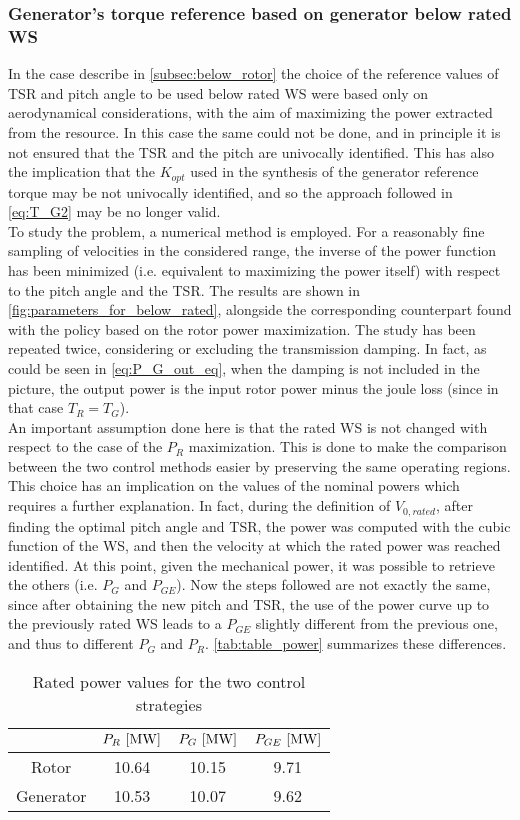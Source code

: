\subsubsection[Below rated WS]{Generator's torque reference based on generator below rated WS}
In the case describe in \autoref{subsec:below_rotor} the choice of the reference values of TSR and pitch angle to be used below rated WS were based only on aerodynamical considerations, with the aim of maximizing the power extracted from the resource. In this case the same could not be done, and in principle it is not ensured that the TSR and the pitch are univocally identified. This has also the implication that the $K_{opt}$ used in the synthesis of the generator reference torque may be not univocally identified, and so the approach followed in \autoref{eq:T_G2} may be no longer valid. \\
To study the problem, a numerical method is employed. For a reasonably fine sampling of velocities in the considered range, the inverse of the power function has been minimized (i.e. equivalent to maximizing the power itself) with respect to the pitch angle and the TSR. The results are shown in \autoref{fig:parameters_for_below_rated}, alongside the corresponding counterpart found with the policy based on the rotor power maximization. The study has been repeated twice, considering or excluding the transmission damping. In fact, as could be seen in \autoref{eq:P_G_out_eq}, when the damping is not included in the picture, the output power is the input rotor power minus the joule loss (since in that case $T_R=T_G$).\\
An important assumption done here is that the rated WS is not changed with respect to the case of the $P_R$ maximization. This is done to make the comparison between the two control methods easier by preserving the same operating regions. This choice has an implication on the values of the nominal powers which requires a further explanation. In fact, during the definition of $V_{0,rated}$, after finding the optimal pitch angle and TSR, the power was computed with the cubic function of the WS, and then the velocity at which the rated power was reached identified. At this point, given the mechanical power, it was possible to retrieve the others (i.e. $P_G$ and $P_{GE}$). Now the steps followed are not exactly the same, since after obtaining the new pitch and TSR, the use of the power curve up to the previously rated WS leads to a $P_{GE}$ slightly different from the previous one, and thus to different $P_G$ and $P_R$. \autoref{tab:table_power} summarizes these differences. 
\begin{table}
  \centering
  \caption{Rated power values for the two control strategies}
  \begin{tabular}{cccc}
    \toprule
    & $P_R \, \left[\si{\mega\watt}\right]$ & $P_G \, \left[\si{\mega\watt}\right]$ & $P_{GE} \, \left[\si{\mega\watt}\right]$\\ \midrule
    Rotor & 10.64 & 10.15 & 9.71 \\
    Generator & 10.53 & 10.07 & 9.62 \\
    \bottomrule
  \end{tabular}
  \label{tab:table_power}
\end{table}

